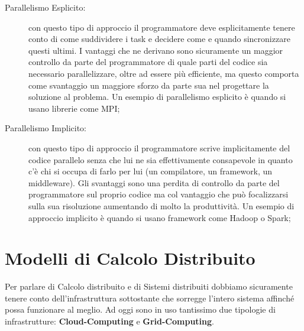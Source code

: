 \begin{description}
  \item[Parallelismo Esplicito:]con questo tipo di approccio il programmatore deve esplicitamente tenere conto di come suddividere i task e decidere come e quando sincronizzare questi ultimi. I vantaggi che ne derivano sono sicuramente un maggior controllo da parte del programmatore di quale parti del codice sia necessario parallelizzare, oltre ad essere più efficiente, ma questo comporta come svantaggio un maggiore sforzo da parte sua nel progettare la soluzione al problema. Un esempio di parallelismo esplicito è quando si usano librerie come MPI;
  \item[Parallelismo Implicito:] con questo tipo di approccio il programmatore scrive implicitamente del codice parallelo senza che lui ne sia effettivamente consapevole in quanto c'è chi si occupa di farlo per lui (un compilatore, un framework, un middleware). Gli svantaggi sono una perdita di controllo da parte del programmatore sul proprio codice ma col vantaggio che può focalizzarsi sulla sua risoluzione aumentando di molto la produttività. Un esempio di approccio implicito è quando si usano framework come Hadoop o Spark;
\end{description}
\section{Modelli di Calcolo Distribuito}
Per parlare di Calcolo distribuito e di Sistemi distribuiti dobbiamo sicuramente tenere conto dell'infrastruttura sottostante che sorregge l'intero sistema affinché possa funzionare al meglio. Ad oggi sono in uso tantissimo due tipologie di infrastrutture: \textbf{Cloud-Computing} e \textbf{Grid-Computing}.

